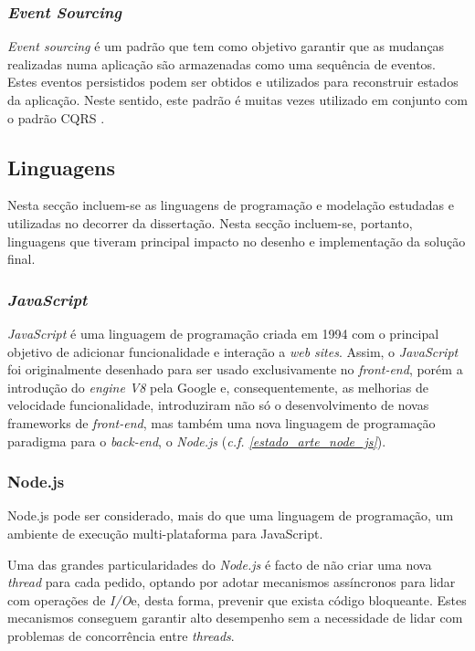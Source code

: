 \subsubsection{\emph{Event Sourcing} \label{event_sourcing}}
\emph{Event sourcing} é um padrão que tem como objetivo garantir que as mudanças realizadas numa aplicação são armazenadas como uma sequência de eventos. Estes eventos persistidos podem ser obtidos e utilizados para reconstruir estados da aplicação.
Neste sentido, este padrão é muitas vezes utilizado em conjunto com o padrão CQRS \cite{event_sourcing}.

\subsection{Linguagens}
Nesta secção incluem-se as linguagens de programação e modelação estudadas e utilizadas no decorrer da dissertação. Nesta secção incluem-se, portanto, linguagens que tiveram principal impacto no desenho e implementação da solução final.

\subsubsection{\emph{JavaScript} \label{estado_arte_javascript}}

\emph{JavaScript} é uma linguagem de programação criada em 1994 com o principal objetivo de adicionar funcionalidade e interação a \emph{web sites}. Assim, o \emph{JavaScript} foi originalmente desenhado para ser usado exclusivamente no \emph{front-end}, porém a introdução do \emph{engine V8} pela Google e, consequentemente, as melhorias de velocidade funcionalidade, introduziram não só o desenvolvimento de novas frameworks de \emph{front-end}, mas também uma nova linguagem de programação paradigma para o \emph{back-end}, o \emph{Node.js} (\emph{c.f. \ref{estado_arte_node_js}})\cite{javascript}.

\subsubsection{Node.js \label{estado_arte_node_js}}
Node.js pode ser considerado, mais do que uma linguagem de programação, um ambiente de execução multi-plataforma para JavaScript\cite{node_js}.

Uma das grandes particularidades do \emph{Node.js} é facto de não criar uma nova \emph{thread} para cada pedido, optando por adotar mecanismos assíncronos para lidar com operações de \emph{I/O}e, desta forma, prevenir que exista código bloqueante. Estes mecanismos conseguem garantir alto desempenho sem a necessidade de lidar com problemas de concorrência entre \emph{threads}\cite{node_js}.

